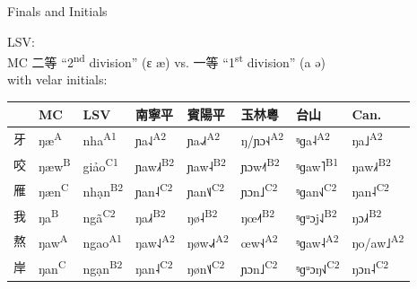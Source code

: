 \documentclass{beamer}
\begin{document}
\begin{frame}[fragile]{Finals and Initials}

LSV:\\ 
MC 二等 \enquote{2\textsuperscript{nd} division} (ɛ æ) vs. 一等 \enquote{1\textsuperscript{st} division} (a ə)\\
with velar initials:\\

\bigskip
{\small
\begin{tabular}{l l|l l l l l l}
 & MC & LSV & 南寧平 & 賓陽平 & 玉林粵 & 台山 & Can.\\ \hline
牙 & ŋæ\textsuperscript{A} & nha\textsuperscript{A1} & ɲa˨˩\textsuperscript{A2} & ɲa˨˩˧\textsuperscript{A2} & ŋ/ɲɔ˧˨\textsuperscript{A2} & ᵑɡa˨\textsuperscript{A2} & ŋa˩\textsuperscript{A2}\\ 
咬 & ŋæw\textsuperscript{B} & giảo\textsuperscript{C1} & ɲaw˩˧\textsuperscript{B2} & ɲaw˨\textsuperscript{B2} & ɲɔw˨˦\textsuperscript{B2} & ᵑɡaw˥\textsuperscript{B1} & ŋaw˩˧\textsuperscript{B2}\\
雁 & ŋæn\textsuperscript{C} & nhạn\textsuperscript{B2} & ɲan˨\textsuperscript{C2} & ɲan˦˩\textsuperscript{C2} &
ɲɔn˩\textsuperscript{C2} &
ᵑɡan˧˩\textsuperscript{C2} &
ŋan˨\textsuperscript{C2}\\ \hline
我 & ŋa\textsuperscript{B} & ngã\textsuperscript{C2} & ŋa˩˧\textsuperscript{B2} & ŋø˨\textsuperscript{B2} & ŋœ˨˦\textsuperscript{B2} & ᵑɡᵘɔj˨˩\textsuperscript{B2} & ŋɔ˩˧\textsuperscript{B2}\\
熬 & ŋaw\textsuperscript{A} & ngao\textsuperscript{A1} & ŋaw˨˩\textsuperscript{A2} & ŋøw˨˩˧\textsuperscript{A2} & œw˧˨\textsuperscript{A2} & ᵑɡaw˨\textsuperscript{A2} & ŋo/aw˩\textsuperscript{A2}\\
岸 & ŋan\textsuperscript{C} & ngạn\textsuperscript{B2} & ŋan˨\textsuperscript{C2} & ŋøn˦˩\textsuperscript{C2} &
ɲɔn˩\textsuperscript{C2} & ᵑɡᵘɔŋ˧˩\textsuperscript{C2} & ŋɔn˨\textsuperscript{C2}\\
\end{tabular}
}
\end{frame}
\end{document}
